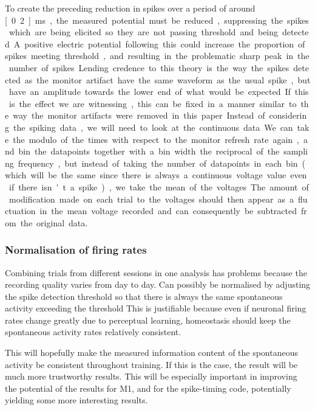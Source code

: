 To create the preceding reduction in spikes over a period of around \unit[0.2]{ms}, the measured potential must be reduced, suppressing the spikes which are being elicited so they are not passing threshold and being detected.
A positive electric potential following this could increase the proportion of spikes meeting threshold, and resulting in the problematic sharp peak in the number of spikes.
Lending credence to this theory is the way the spikes detected as the monitor artifact have the same waveform as the usual spike, but have an amplitude towards the lower end of what would be expected.

If this is the effect we are witnessing, this can be fixed in a manner similar to the way the monitor artifacts were removed in this paper. Instead of considering the spiking data, we will need to look at the continuous data. We can take the modulo of the times with respect to the monitor refresh rate again, and bin the datapoints together with a bin width the reciprocal of the sampling frequency, but instead of taking the number of datapoints in each bin (which will be the same since there is always a continuous voltage value even if there isn't a spike), we take the mean of the voltages. The amount of modification made on each trial to the voltages should then appear as a fluctuation in the mean voltage recorded and can consequently be subtracted from the original data.

\subsubsection{Normalisation of firing rates}

Combining trials from different sessions in one analysis has problems because the recording quality varies from day to day.
Can possibly be normalised by adjusting the spike detection threshold so that there is always the same spontaneous activity exceeding the threshold
This is justifiable because even if neuronal firing rates change greatly due to perceptual learning, homeostasis should keep the spontaneous activity rates relatively consistent.

This will hopefully make the measured information content of the spontaneous activity be consistent throughout training. If this is the case, the result will be much more trustworthy results. This will be especially important in improving the potential of the results for M1, and for the spike-timing code, potentially yielding some more interesting results.

